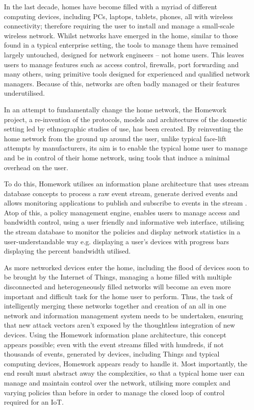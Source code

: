 In the last decade, homes have become filled with a myriad of different computing devices, including PCs, laptops, tablets, phones, all with wireless connectivity; therefore requiring the user to install and manage a small-scale wireless network. Whilst networks have emerged in the home, similar to those found in a typical enterprise setting, the tools to manage them have remained largely untouched, designed for network engineers -- not home users. This leaves users to manage features such as access control, firewalls, port forwarding and many others, using primitive tools designed for experienced and qualified network managers. Because of this, networks are often badly managed or their features underutilised.

In an attempt to fundamentally change the home network, the Homework project\cite{Homework, HomeworkControl}, a re-invention of the protocols, models and architectures of the domestic setting led by ethnographic studies of use, has been created. By reinventing the home network from the ground up around the user, unlike typical face-lift attempts by manufacturers, its aim is to enable the typical home user to manage and be in control of their home network, using tools that induce a minimal overhead on the user. 

To do this, Homework utilises an information plane architecture that uses stream database concepts to process a raw event stream, generate derived events and allows monitoring applications to publish and subscribe to events in the stream \cite{InformationPlane}. Atop of this, a policy management engine, enables users to manage access and bandwidth control, using a user friendly and informative web interface, utilising the stream database to monitor the policies and display network statistics in a user-understandable way e.g. displaying a user's devices with progress bars displaying the percent bandwidth utilised.

As more networked devices enter the home, including the flood of devices soon to be brought by the Internet of Things, managing a home filled with multiple disconnected and heterogeneously filled networks will become an even more important and difficult task for the home user to perform. Thus, the task of intelligently merging these networks together and creation of an all in one network and information management system needs to be undertaken, ensuring that new attack vectors aren't exposed by the thoughtless integration of new devices. Using the Homework information plane architecture, this concept appears possible; even with the event streams filled with hundreds, if not thousands of events, generated by devices, including Things and typical computing devices, Homework appears ready to handle it\cite{DEBSChallenge}. Most importantly, the end result must abstract away the complexities, so that a typical home user can manage and maintain control over the network, utilising more complex and varying policies than before in order to manage the closed loop of control required for an IoT.